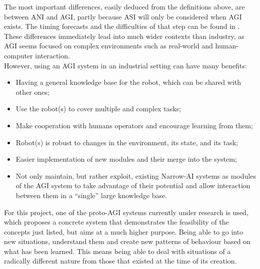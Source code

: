 The most important differences, easily deduced from the definitions above, are between ANI and AGI, partly because ASI will only be considered when AGI exists. 
The timing forecasts and the difficulties of that step can be found in \cite{995_experts_opinions}. \\
These differences immediately lead into much wider contexts than industry, as AGI seems focused on complex environments such as real-world and human-computer interaction. \\
However, using an AGI system in an industrial setting can have many benefits:

\begin{itemize}
	\item Having a general knowledge base for the robot, which can be shared with other ones;
	\item Use the robot(s) to cover multiple and complex tasks;
	\item Make cooperation with humans operators and encourage learning from them;
	\item Robot(s) is robust to changes in the environment, its state, and its task;
	\item Easier implementation of new modules and their merge into the system;
	\item Not only maintain, but rather exploit, existing Narrow-AI systems as modules of the AGI system to take advantage of their potential and allow interaction between them in a \enquote{single} large knowledge base.
\end{itemize}

For this project, one of the proto-AGI\footnotemark{} systems currently under research is used, which proposes a concrete system that demonstrates the feasibility of the concepts just listed, but aims at a much higher purpose. Being able to go into new situations, understand them and create new patterns of behaviour based on what has been learned. This means being able to deal with situations of a radically different nature from those that existed at the time of its creation. \\

